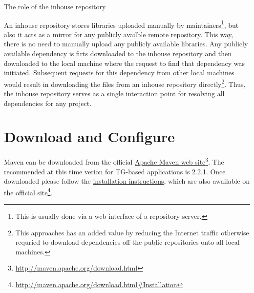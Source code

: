   \begin{image}{The role of the inhouse repository}{\label{img:ch00:01:maven_repository_structure}}    
  \end{image}

  An inhouse repository stores libraries uploaded manually by maintainers\footnote{This is usually done via a web interface of a repository server.}, but also it acts as a mirror for any publicly availble remote repository.
  This way, there is no need to manually upload any publicly available libraries.
  Any publicly available dependency is firts downloaded to the inhouse repository and then downloaded to the local machine where the request to find that dependency was initiated.
  Subsequent requests for this dependency from other local machines would result in downloading the files from an inhouse repository directly\footnote{
  This approaches has an added value by reducing the Internet traffic otherwise requried to download dependencies off the public repositories onto all local machines.
  }.  
  Thus, the inhouse repository serves as a single interaction point for resolving all dependencies for any project.
  
  \section*{Download and Configure} 
  Maven can be downloaded from the official \href{http://maven.apache.org/download.html}{Apache Maven web site}\footnote{\url{http://maven.apache.org/download.html}}.
  The recommended at this time verion for TG-based applications is 2.2.1.
  Once downloaded please follow the \href{http://maven.apache.org/download.html#Installation}{installation instructions}, which are also awailable on the official site\footnote{\url{http://maven.apache.org/download.html\#Installation}}.
  
